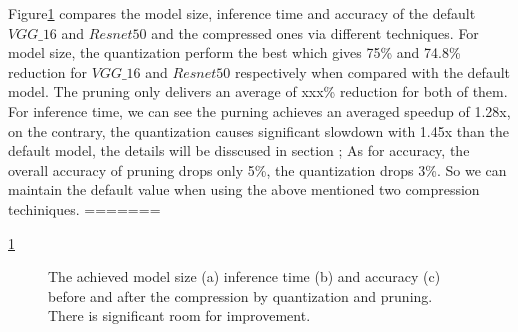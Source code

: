 Figure\ref{fig:motivation} compares the model size, inference time and accuracy of the default
$VGG\_16$ and $Resnet50$ and the compressed ones via different techniques.
For model size, the quantization perform the best which gives 75\% and 74.8\%
reduction for $VGG\_16$ and $Resnet50$ respectively when compared with the default model. 
The pruning only delivers an average of xxx\% reduction for both of them.
For inference time, we can see the purning achieves an averaged speedup of 1.28x,
on the contrary, the quantization causes significant slowdown with 1.45x than the default model,
the details will be disscused in section \FIXME{};
As for accuracy,  the overall accuracy of pruning drops only 5\%, the quantization drops 3\%.
So we can maintain the default value when using the above mentioned two compression techiniques.
=======



\ref{fig:motivation}

\begin{figure}[!t]
\centering
{}
\hfill
{}
\hfill
{}
\caption{The achieved model size (a) inference time (b) and accuracy (c) before and after the compression by quantization and pruning.
There is significant room for improvement.} 
\label{fig:motivation}
\end{figure}

